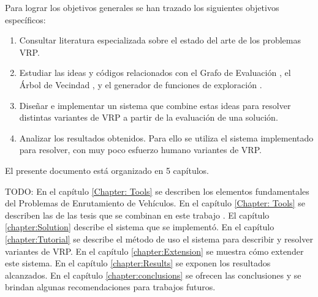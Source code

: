Para lograr los objetivos generales se han trazado los siguientes objetivos específicos:

\begin{enumerate}
	\item Consultar literatura especializada sobre el estado del arte de los problemas VRP.
	\item Estudiar las ideas y códigos relacionados con el Grafo de Evaluación \cite{JJ}, el Árbol de Vecindad \cite{Heidy}, y el generador de funciones de exploración \cite{Hector}.
	\item Diseñar e implementar un sistema que combine estas ideas para resolver distintas variantes de VRP a partir de la evaluación de una solución.
	\item Analizar los resultados obtenidos. Para ello se utiliza el sistema implementado para resolver, con muy poco esfuerzo humano variantes de VRP.
\end{enumerate}
El presente documento está organizado en 5 capítulos.

TODO:
En el capítulo \ref{Chapter: Tools} se describen los elementos fundamentales del Problemas de Enrutamiento de Vehículos. En el capítulo \ref{Chapter: Tools} se describen las de las tesis que se combinan en este trabajo \cite{JJ,Heidy,Hector}. El capítulo \ref{chapter:Solution} describe el sistema que se implementó. En el capítulo \ref{chapter:Tutorial} se describe el método de uso el sistema para describir y resolver variantes de VRP. En el capítulo \ref{chapter:Extension} se muestra cómo extender este sistema. En el capítulo \ref{chapter:Results} se exponen los resultados alcanzados. En el capítulo \ref{chapter:conclusions} se ofrecen las conclusiones y se brindan algunas recomendaciones para trabajos futuros.





